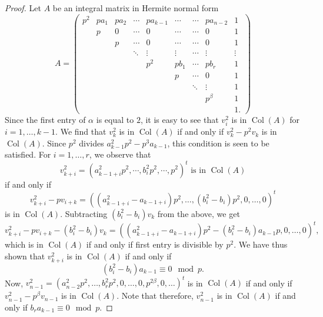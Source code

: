 \documentclass[a4paper]{amsart}
\numberwithin{equation}{section}
\theoremstyle{remark}
\newcommand{\op}[1]{\operatorname{#1}}
\begin{document}
 \begin{proof}
 Let $A$ be an integral matrix in Hermite normal form \[A=\begin{pmatrix}
	 p^{2}& p a_1 & pa_2 & \cdots & pa_{k-1}& \cdots & \cdots & p a_{n-2} & 1 \\
	& p & 0 & \cdots & 0 &  \cdots & \cdots & 0 & 1\\
	&& p & \cdots & 0 & \cdots &  \cdots & 0  & 1\\
	&&& \ddots & \vdots& \vdots & \cdots & \vdots & \vdots\\
	&&&& p^{2} & p b_1 & \cdots & p b_r & 1\\
    &&&&  & p & \cdots & 0 & 1\\
    	&&&&& & \ddots & \vdots & 1\\
	&&&&&&& p^{\beta} & 1\\
	&&&&&&&&1.
	\end{pmatrix}\]
Since the first entry of $\alpha$ is equal to $2$, it is easy to see that $v_i^2$ is in $\op{Col}(A)$ for $i=1,\dots, k-1$. We find that $v_k^2$ is in $\op{Col}(A)$ if and only if $v_k^2-p^2 v_k$ is in $\op{Col}(A)$. Since $p^2$ divides $a_{k-1}^2p^2-p^3a_{k-1}$, this condition is seen to be satisfied. For $i=1,\dots, r$, we observe that 
\[v_{k+i}^2=(a_{k-1+i}^2 p^2, \cdots , b_i^2p^2, \cdots, p^2)^t\text{ is in }\op{Col}(A)\]if and only if 
\[v_{k+i}^2-p v_{i+k}=\left((a_{k-1+i}^2-a_{k-1+i})p^2, \dots, (b_i^2-b_i) p^2, 0,\dots,0\right)^t\] is in $\op{Col}(A)$. Subtracting $(b_i^2-b_i) v_k$ from the above, we get 
\[v_{k+i}^2-p v_{i+k}-(b_i^2-b_i) v_k=\left((a_{k-1+i}^2-a_{k-1+i})p^2-(b_i^2-b_i)a_{k-1}p, 0, \dots, 0\right)^t, \] which is in $\op{Col}(A)$ if and only if first entry is divisible by $p^2$. We have thus shown that $v_{k+i}^2$ is in $\op{Col}(A)$ if and only if 
\begin{equation}
    (b_i^2-b_i)a_{k-1}\equiv 0\mod{p}. 
\end{equation}
Now, $v_{n-1}^2=\left(a_{n-2}^2 p^2, \dots, b_r^2 p^2, 0,  \dots, 0, p^{2\beta}, 0, \dots \right)^t$ is in $\op{Col}(A)$ if and only if $v_{n-1}^2-p^\beta v_{n-1}$ is in $\op{Col}(A)$. Note that therefore, $v_{n-1}^2$ is in $\op{Col}(A)$ if and only if $b_r a_{k-1}\equiv 0\mod{p}$. 


\end{proof}
\end{document}
